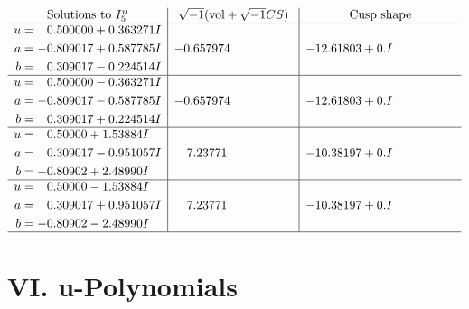 \documentclass[1p]{elsarticle_modified}
\theoremstyle{definition}
\newcommand{\I}{\sqrt{-1}}
\begin{document}
$$\begin{array}{c|c|c}  
\text{Solutions to }I^u_{5}& \I (\text{vol} + \sqrt{-1}CS) & \text{Cusp shape}\\
 \hline 
\begin{aligned}
u &= \phantom{-}0.500000 + 0.363271 I \\
a &= -0.809017 + 0.587785 I \\
b &= \phantom{-}0.309017 - 0.224514 I\end{aligned}
 & -0.657974\phantom{ +0.000000I} & -12.61803 + 0. I\phantom{ +0.000000I} \\ \hline\begin{aligned}
u &= \phantom{-}0.500000 - 0.363271 I \\
a &= -0.809017 - 0.587785 I \\
b &= \phantom{-}0.309017 + 0.224514 I\end{aligned}
 & -0.657974\phantom{ +0.000000I} & -12.61803 + 0. I\phantom{ +0.000000I} \\ \hline\begin{aligned}
u &= \phantom{-}0.50000 + 1.53884 I \\
a &= \phantom{-}0.309017 - 0.951057 I \\
b &= -0.80902 + 2.48990 I\end{aligned}
 & \phantom{-}7.23771\phantom{ +0.000000I} & -10.38197 + 0. I\phantom{ +0.000000I} \\ \hline\begin{aligned}
u &= \phantom{-}0.50000 - 1.53884 I \\
a &= \phantom{-}0.309017 + 0.951057 I \\
b &= -0.80902 - 2.48990 I\end{aligned}
 & \phantom{-}7.23771\phantom{ +0.000000I} & -10.38197 + 0. I\phantom{ +0.000000I}\\
 \hline 
 \end{array}$$\newpage
\newpage\renewcommand{\arraystretch}{1}
\centering \section*{ VI. u-Polynomials}
\end{document}
